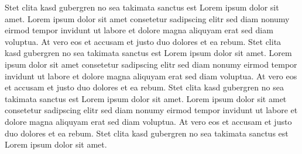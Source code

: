 \documentclass[master,german,smartquotes]{hgbthesis}
\begin{document}
Stet clita kasd gubergren no sea takimata sanctus est Lorem ipsum dolor sit amet. Lorem ipsum dolor sit amet consetetur sadipscing elitr sed diam nonumy eirmod tempor invidunt ut labore et dolore magna aliquyam erat sed diam voluptua. At vero eos et accusam et justo duo dolores et ea rebum. Stet clita kasd gubergren no sea takimata sanctus est Lorem ipsum dolor sit amet. Lorem ipsum dolor sit amet consetetur sadipscing elitr sed diam nonumy eirmod tempor invidunt ut labore et dolore magna aliquyam erat sed diam voluptua. At vero eos et accusam et justo duo dolores et ea rebum. Stet clita kasd gubergren no sea takimata sanctus est Lorem ipsum dolor sit amet. Lorem ipsum dolor sit amet consetetur sadipscing elitr sed diam nonumy eirmod tempor invidunt ut labore et dolore magna aliquyam erat sed diam voluptua. At vero eos et accusam et justo duo dolores et ea rebum. Stet clita kasd gubergren no sea takimata sanctus est Lorem ipsum dolor sit amet.


\printacronyms


\MakeBibliography                        %




\end{document}
